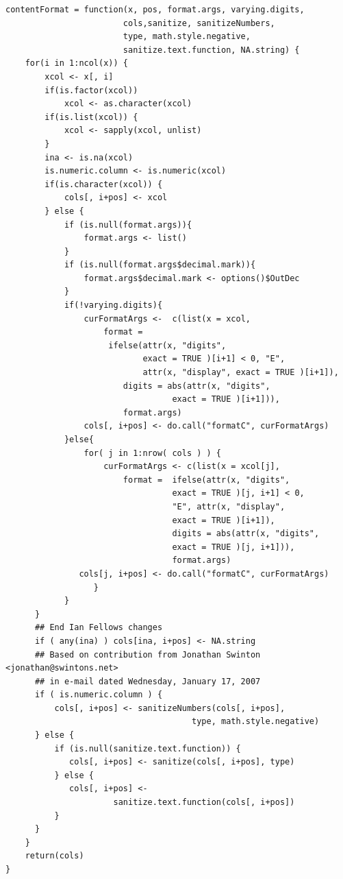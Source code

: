 \documentclass{memoir}\usepackage[]{graphicx}\usepackage[]{color}
\begin{document}
\begin{lstlisting}
contentFormat = function(x, pos, format.args, varying.digits, 
                        cols,sanitize, sanitizeNumbers, 
                        type, math.style.negative,
                        sanitize.text.function, NA.string) {
    for(i in 1:ncol(x)) {   
        xcol <- x[, i]
        if(is.factor(xcol))
            xcol <- as.character(xcol)
        if(is.list(xcol)) {
            xcol <- sapply(xcol, unlist)
        }
        ina <- is.na(xcol)
        is.numeric.column <- is.numeric(xcol)
        if(is.character(xcol)) {
            cols[, i+pos] <- xcol
        } else {
            if (is.null(format.args)){
                format.args <- list()
            }
            if (is.null(format.args$decimal.mark)){
                format.args$decimal.mark <- options()$OutDec
            }
            if(!varying.digits){
                curFormatArgs <-  c(list(x = xcol,
                    format =
                     ifelse(attr(x, "digits", 
                            exact = TRUE )[i+1] < 0, "E",
                            attr(x, "display", exact = TRUE )[i+1]),
                        digits = abs(attr(x, "digits", 
                                  exact = TRUE )[i+1])),
                        format.args)
                cols[, i+pos] <- do.call("formatC", curFormatArgs)
            }else{
                for( j in 1:nrow( cols ) ) {
                    curFormatArgs <- c(list(x = xcol[j],
                        format =  ifelse(attr(x, "digits", 
                                  exact = TRUE )[j, i+1] < 0,
                                  "E", attr(x, "display", 
                                  exact = TRUE )[i+1]),
                                  digits = abs(attr(x, "digits", 
                                  exact = TRUE )[j, i+1])),
                                  format.args)
               cols[j, i+pos] <- do.call("formatC", curFormatArgs)
                  }
            }
      }
      ## End Ian Fellows changes
      if ( any(ina) ) cols[ina, i+pos] <- NA.string
      ## Based on contribution from Jonathan Swinton <jonathan@swintons.net>
      ## in e-mail dated Wednesday, January 17, 2007
      if ( is.numeric.column ) {
          cols[, i+pos] <- sanitizeNumbers(cols[, i+pos], 
                                      type, math.style.negative)
      } else {
          if (is.null(sanitize.text.function)) {
             cols[, i+pos] <- sanitize(cols[, i+pos], type)
          } else {
             cols[, i+pos] <- 
                      sanitize.text.function(cols[, i+pos])
          }
      }
    }
    return(cols)
}


\end{lstlisting}
\end{document}
